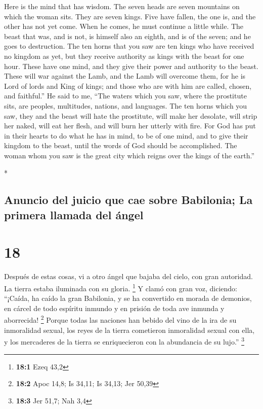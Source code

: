 \begin{paracol}{2}
\begin{otherlanguage}{english}
 Here is the mind that has wisdom. The seven heads are
seven mountains on which the woman sits.  They are seven
kings. Five have fallen, the one is, and the other has not yet come.
When he comes, he must continue a little while.  The
beast that was, and is not, is himself also an eighth, and is of the
seven; and he goes to destruction.  The ten horns that
you saw are ten kings who have received no kingdom as yet, but they
receive authority as kings with the beast for one hour. 
These have one mind, and they give their power and authority to the
beast.  These will war against the Lamb, and the Lamb
will overcome them, for he is Lord of lords and King of kings; and those
who are with him are called, chosen, and faithful.''  He
said to me, ``The waters which you saw, where the prostitute sits, are
peoples, multitudes, nations, and languages.  The ten
horns which you saw, they and the beast will hate the prostitute, will
make her desolate, will strip her naked, will eat her flesh, and will
burn her utterly with fire.  For God has put in their
hearts to do what he has in mind, to be of one mind, and to give their
kingdom to the beast, until the words of God should be accomplished.
 The woman whom you saw is the great city which reigns
over the kings of the earth.''

\end{otherlanguage}

\switchcolumn[0]*

\hypertarget{anuncio-del-juicio-que-cae-sobre-babilonia-la-primera-llamada-del-uxe1ngel}{%
\subsection{Anuncio del juicio que cae sobre Babilonia; La primera
llamada del
ángel}\label{anuncio-del-juicio-que-cae-sobre-babilonia-la-primera-llamada-del-uxe1ngel}}

\hypertarget{section-34}{%
\section{18}\label{section-34}}

 Después de estas cosas, vi a otro ángel que bajaba del
cielo, con gran autoridad. La tierra estaba iluminada con su gloria.
\footnote{\textbf{18:1} Ezeq 43,2}  Y clamó con gran voz,
diciendo: ``¡Caída, ha caído la gran Babilonia, y se ha convertido en
morada de demonios, en cárcel de todo espíritu inmundo y en prisión de
toda ave inmunda y aborrecida! \footnote{\textbf{18:2} Apoc 14,8; Is
  34,11; Is 34,13; Jer 50,39}  Porque todas las naciones
han bebido del vino de la ira de su inmoralidad sexual, los reyes de la
tierra cometieron inmoralidad sexual con ella, y los mercaderes de la
tierra se enriquecieron con la abundancia de su lujo.'' \footnote{\textbf{18:3}
  Jer 51,7; Nah 3,4}


\end{paracol}
